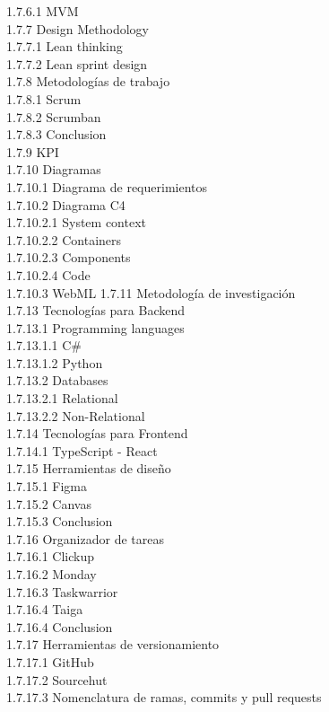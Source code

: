 1.7.6.1 MVM\\
1.7.7 Design Methodology\\
1.7.7.1 Lean thinking\\
1.7.7.2 Lean sprint design\\
1.7.8 Metodologías de trabajo\\
1.7.8.1 Scrum\\
1.7.8.2 Scrumban\\
1.7.8.3 Conclusion\\
1.7.9 KPI\\
1.7.10 Diagramas\\
1.7.10.1 Diagrama de requerimientos\\
1.7.10.2 Diagrama C4\\
1.7.10.2.1 System context\\
1.7.10.2.2 Containers\\
1.7.10.2.3 Components\\
1.7.10.2.4 Code\\
1.7.10.3 WebML
1.7.11 Metodología de investigación\\
1.7.13 Tecnologías para Backend\\
1.7.13.1 Programming languages\\
1.7.13.1.1 C\#\\
1.7.13.1.2 Python\\
1.7.13.2 Databases\\
1.7.13.2.1 Relational\\
1.7.13.2.2 Non-Relational\\
1.7.14 Tecnologías para Frontend\\
1.7.14.1 TypeScript - React\\
1.7.15 Herramientas de diseño\\
1.7.15.1 Figma\\
1.7.15.2 Canvas\\
1.7.15.3 Conclusion\\
1.7.16 Organizador de tareas\\
1.7.16.1 Clickup\\
1.7.16.2 Monday\\
1.7.16.3 Taskwarrior\\
1.7.16.4 Taiga\\
1.7.16.4 Conclusion\\
1.7.17 Herramientas de versionamiento\\
1.7.17.1 GitHub\\
1.7.17.2 Sourcehut\\
1.7.17.3 Nomenclatura de ramas, commits y pull requests\\
